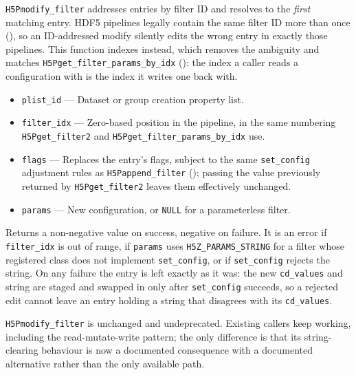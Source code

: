 \documentclass[../RFC-HDFG-2026-001.tex]{subfiles}
\begin{document}

\texttt{H5Pmodify\_filter} addresses entries by filter ID and resolves to
the \emph{first} matching entry.  HDF5 pipelines legally contain the same
filter ID more than once (), so an
ID-addressed modify silently edits the wrong entry in exactly those
pipelines.  This function indexes instead, which removes the ambiguity and
matches \texttt{H5Pget\_filter\_params\_by\_idx}
(): the index a caller reads a configuration
with is the index it writes one back with.

\begin{itemize}
\item \texttt{plist\_id} --- Dataset or group creation property list.
\item \texttt{filter\_idx} --- Zero-based position in the pipeline, in the
  same numbering \texttt{H5Pget\_filter2} and
  \texttt{H5Pget\_filter\_params\_by\_idx} use.
\item \texttt{flags} --- Replaces the entry's flags, subject to the same
  \texttt{set\_config} adjustment rules as \texttt{H5Pappend\_filter}
  (); passing the value previously
  returned by \texttt{H5Pget\_filter2} leaves them effectively unchanged.
\item \texttt{params} --- New configuration, or \texttt{NULL} for a
  parameterless filter.
\end{itemize}

Returns a non-negative value on success, negative on failure.  It is an
error if \texttt{filter\_idx} is out of range, if \texttt{params} uses
\texttt{H5Z\_PARAMS\_STRING} for a filter whose registered class does not
implement \texttt{set\_config}, or if \texttt{set\_config} rejects the
string.  On any failure the entry is left exactly as it was: the new
\texttt{cd\_values} and string are staged and swapped in only after
\texttt{set\_config} succeeds, so a rejected edit cannot leave an entry
holding a string that disagrees with its \texttt{cd\_values}.

\texttt{H5Pmodify\_filter} is unchanged and undeprecated.  Existing callers
keep working, including the read-mutate-write pattern; the only difference
is that its string-clearing behaviour is now a documented consequence with
a documented alternative rather than the only available path.
\end{document}
